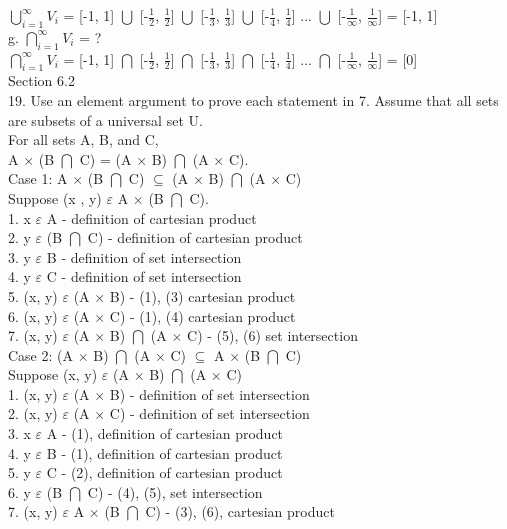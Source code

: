 \documentclass{article}
\begin{document}
$\bigcup\limits_{i=1}^{\infty} V_{i}$ = [-1, 1] $\bigcup$ [-{\Large  $\frac{1}{2}$}, {\Large  $\frac{1}{2}$}] $\bigcup$ [-{\Large  $\frac{1}{3}$}, {\Large  $\frac{1}{3}$}] $\bigcup$ [-{\Large  $\frac{1}{4}$}, {\Large  $\frac{1}{4}$}] ... $\bigcup$ [-{\Large  $\frac{1}{\infty}$}, {\Large  $\frac{1}{\infty}$}] = [-1, 1] \\
g. $\bigcap\limits_{i=1}^{\infty} V_{i}$ = ? \\
$\bigcap\limits_{i=1}^{\infty} V_{i}$ = [-1, 1] $\bigcap$ [-{\Large  $\frac{1}{2}$}, {\Large  $\frac{1}{2}$}] $\bigcap$ [-{\Large  $\frac{1}{3}$}, {\Large  $\frac{1}{3}$}] $\bigcap$ [-{\Large  $\frac{1}{4}$}, {\Large  $\frac{1}{4}$}] ... $\bigcap$ [-{\Large  $\frac{1}{\infty}$}, {\Large  $\frac{1}{\infty}$}] = [0] \\

Section 6.2\\
19. Use an element argument to prove each statement in 7. Assume that all sets are subsets of a universal set U. \\
For all sets A, B, and C, \\
A $\times$ (B $\bigcap$ C) = (A $\times$ B) $\bigcap$ (A $\times$ C). \\
Case 1: A $\times$ (B $\bigcap$ C) $\subseteq$ (A $\times$ B) $\bigcap$ (A $\times$ C) \\
Suppose (x , y) $\varepsilon$ A $\times$ (B $\bigcap$ C). \\
1. x $\varepsilon$ A - definition of cartesian product \\
2. y $\varepsilon$ (B $\bigcap$ C) - definition of cartesian product \\
3. y $\varepsilon$ B - definition of set intersection \\
4. y $\varepsilon$ C - definition of set intersection \\
5. (x, y) $\varepsilon$ (A $\times$ B) - (1), (3) cartesian product \\
6. (x, y) $\varepsilon$ (A $\times$ C) - (1), (4) cartesian product \\
7. (x, y) $\varepsilon$ (A $\times$ B) $\bigcap$ (A $\times$ C) - (5), (6) set intersection \\
Case 2: (A $\times$ B) $\bigcap$ (A $\times$ C) $\subseteq$ A $\times$ (B $\bigcap$ C) \\
Suppose (x, y) $\varepsilon$ (A $\times$ B) $\bigcap$ (A $\times$ C) \\
1. (x, y) $\varepsilon$ (A $\times$ B) - definition of set intersection \\
2. (x, y) $\varepsilon$ (A $\times$ C) - definition of set intersection \\
3. x $\varepsilon$ A - (1), definition of cartesian product \\
4. y $\varepsilon$ B - (1), definition of cartesian product \\
5. y $\varepsilon$ C - (2), definition of cartesian product \\
6. y $\varepsilon$ (B $\bigcap$ C) - (4), (5), set intersection \\
7. (x, y) $\varepsilon$ A $\times$ (B $\bigcap$ C) - (3), (6), cartesian product\\
\end{document}
